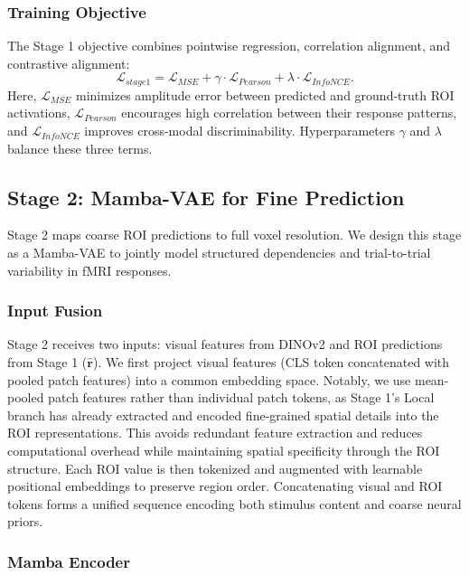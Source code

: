 \subsubsection{Training Objective}

The Stage 1 objective combines pointwise regression, correlation alignment, and contrastive alignment:
\begin{equation}
  \mathcal{L}_{stage1} = \mathcal{L}_{MSE} + \gamma \cdot \mathcal{L}_{Pearson} + \lambda \cdot \mathcal{L}_{InfoNCE}.
\end{equation}
Here, $\mathcal{L}_{MSE}$ minimizes amplitude error between predicted and ground-truth ROI activations, $\mathcal{L}_{Pearson}$ encourages high correlation between their response patterns, and $\mathcal{L}_{InfoNCE}$ improves cross-modal discriminability. Hyperparameters $\gamma$ and $\lambda$ balance these three terms.

\subsection{Stage 2: Mamba-VAE for Fine Prediction}

Stage 2 maps coarse ROI predictions to full voxel resolution. We design this stage as a Mamba-VAE to jointly model structured dependencies and trial-to-trial variability in fMRI responses.

\subsubsection{Input Fusion}

Stage 2 receives two inputs: visual features from DINOv2 and ROI predictions from Stage 1 ($\hat{\mathbf{r}}$). We first project visual features (CLS token concatenated with pooled patch features) into a common embedding space. Notably, we use mean-pooled patch features rather than individual patch tokens, as Stage 1's Local branch has already extracted and encoded fine-grained spatial details into the ROI representations. This avoids redundant feature extraction and reduces computational overhead while maintaining spatial specificity through the ROI structure. Each ROI value is then tokenized and augmented with learnable positional embeddings to preserve region order. Concatenating visual and ROI tokens forms a unified sequence encoding both stimulus content and coarse neural priors.

\subsubsection{Mamba Encoder}

